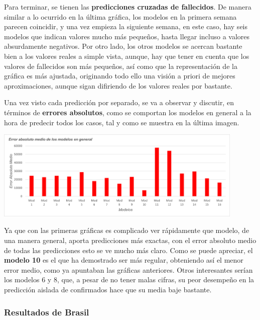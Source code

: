 \documentclass[12pt,a4paper, xcolor=table]{article}
\begin{document}
            Para terminar, se tienen las \textbf{predicciones cruzadas de fallecidos}. De manera similar a lo ocurrido en la última gráfica, los modelos en la primera semana parecen coincidir, y una vez empieza la siguiente semana, en este caso, hay seis modelos que indican valores mucho más pequeños, hasta llegar incluso a valores absurdamente negativos. Por otro lado, los otros modelos se acercan bastante bien a los valores reales a simple vista, aunque, hay que tener en cuenta que los valores de fallecidos son más pequeños, así como que la representación de la gráfica es más ajustada, originando todo ello una visión a priori de mejores aproximaciones, aunque sigan difiriendo de los valores reales por bastante.

            \vspace{3mm}

            Una vez visto cada predicción por separado, se va a observar y discutir, en términos de \textbf{errores absolutos}, como se comportan los modelos en general a la hora de predecir todos los casos, tal y como se muestra en la última imagen.

            \begin{center}
                \centering
                \includegraphics[width=450px]{img/eam_ES_parte2.png}
            \end{center}


            Ya que con las primeras gráficas es complicado ver rápidamente que modelo, de una manera general, aporta predicciones más exactas, con el error absoluto medio de todas las predicciones esto se ve mucho más claro. Como se puede apreciar, el \textbf{modelo 10} es el que ha demostrado ser más regular, obteniendo así el menor error medio, como ya apuntaban las gráficas anteriores. Otros interesantes serían los modelos 6 y 8, que, a pesar de no tener malas cifras, su peor desempeño en la predicción aislada de confirmados hace que su media baje bastante.

            \subsubsection{Resultados de Brasil}
\end{document}
